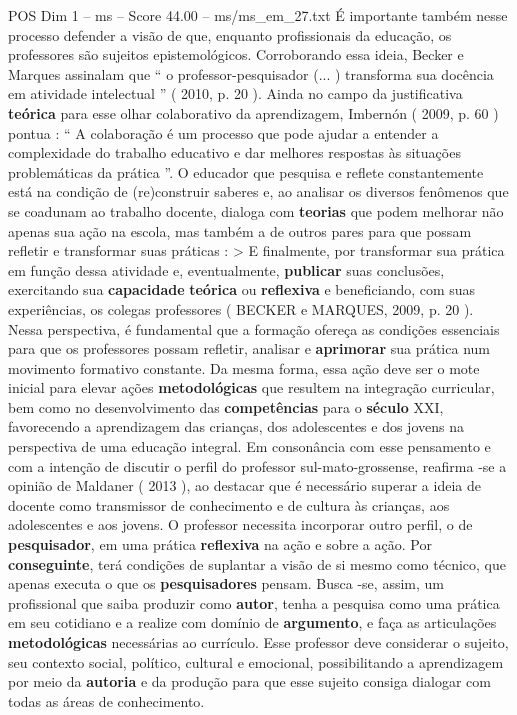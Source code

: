 \begin{textsample}{POS Dim 1 – ms – Score 44.00 – ms/ms\_em\_27.txt}
É importante também nesse processo defender a visão de que, enquanto profissionais da educação, os professores são sujeitos epistemológicos.
Corroborando essa ideia, Becker e Marques assinalam que “ o professor-pesquisador (... ) transforma sua docência em atividade intelectual ” ( 2010, p. 20 ).
Ainda no campo da justificativa \textbf{teórica} para esse olhar colaborativo da aprendizagem, Imbernón ( 2009, p. 60 ) pontua : “ A colaboração é um processo que pode ajudar a entender a complexidade do trabalho educativo e dar melhores respostas às situações problemáticas da prática ”.
O educador que pesquisa e reflete constantemente está na condição de (re)construir saberes e, ao analisar os diversos fenômenos que se coadunam ao trabalho docente, dialoga com \textbf{teorias} que podem melhorar não apenas sua ação na escola, mas também a de outros pares para que possam refletir e transformar suas práticas : > E finalmente, por transformar sua prática em função dessa atividade e, eventualmente, \textbf{publicar} suas conclusões, exercitando sua \textbf{capacidade} \textbf{teórica} ou \textbf{reflexiva} e beneficiando, com suas experiências, os colegas professores ( BECKER e MARQUES, 2009, p. 20 ).
Nessa perspectiva, é fundamental que a formação ofereça as condições essenciais para que os professores possam refletir, analisar e \textbf{aprimorar} sua prática num movimento formativo constante.
Da mesma forma, essa ação deve ser o mote inicial para elevar ações \textbf{metodológicas} que resultem na integração curricular, bem como no desenvolvimento das \textbf{competências} para o \textbf{século} XXI, favorecendo a aprendizagem das crianças, dos adolescentes e dos jovens na perspectiva de uma educação integral.
Em consonância com esse pensamento e com a intenção de discutir o perfil do professor sul-mato-grossense, reafirma -se a opinião de Maldaner ( 2013 ), ao destacar que é necessário superar a ideia de docente como transmissor de conhecimento e de cultura às crianças, aos adolescentes e aos jovens.
O professor necessita incorporar outro perfil, o de \textbf{pesquisador}, em uma prática \textbf{reflexiva} na ação e sobre a ação.
Por \textbf{conseguinte}, terá condições de suplantar a visão de si mesmo como técnico, que apenas executa o que os \textbf{pesquisadores} pensam.
Busca -se, assim, um profissional que saiba produzir como \textbf{autor}, tenha a pesquisa como uma prática em seu cotidiano e a realize com domínio de \textbf{argumento}, e faça as articulações \textbf{metodológicas} necessárias ao currículo.
Esse professor deve considerar o sujeito, seu contexto social, político, cultural e emocional, possibilitando a aprendizagem por meio da \textbf{autoria} e da produção para que esse sujeito consiga dialogar com todas as áreas de conhecimento.

\end{textsample}
